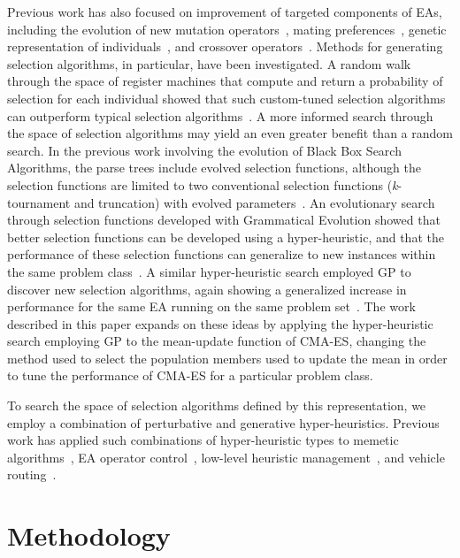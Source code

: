 \documentclass[sigconf]{acmart}
\begin{document}
Previous work has also focused on improvement of targeted components of EAs, including the evolution of new mutation operators~\citep{woodward2012mutationGeneration, hong2013probMutation}, mating preferences~\citep{guntly2011limp}, genetic representation of individuals~\citep{scott2015geneticRepresentations}, and crossover operators~\citep{goldman2011scc}. Methods for generating selection algorithms, in particular, have been investigated. A random walk through the space of register machines that compute and return a probability of selection for each individual showed that such custom-tuned selection algorithms can outperform typical selection algorithms~\citep{woodward2011selection}. A more informed search through the space of selection algorithms may yield an even greater benefit than a random search. In the previous work involving the evolution of Black Box Search Algorithms, the parse trees include evolved selection functions, although the selection functions are limited to two conventional selection functions (\textit{k}-tournament and truncation) with evolved parameters~\citep{martin2013evolvingBBSA}. An evolutionary search through selection functions developed with Grammatical Evolution showed that better selection functions can be developed using a hyper-heuristic, and that the performance of these selection functions can generalize to new instances within the same problem class~\citep{lourencco2013selection}. A similar hyper-heuristic search employed GP to discover new selection algorithms, again showing a generalized increase in performance for the same EA running on the same problem set~\citep{richter2018adpsea}. The work described in this paper expands on these ideas by applying the hyper-heuristic search employing GP to the mean-update function of CMA-ES, changing the method used to select the population members used to update the mean in order to tune the performance of CMA-ES for a particular problem class.

To search the space of selection algorithms defined by this representation, we employ a combination of perturbative and generative hyper-heuristics. Previous work has applied such combinations of hyper-heuristic types to memetic algorithms~\citep{krasnogor2004memetic}, EA operator control~\citep{maturana2010autonomous}, low-level heuristic management~\citep{remde2012empirical}, and vehicle routing~\citep{garrido2010vehicleRouting}. 

\section{Methodology}
\label{Methodology}
\end{document}
